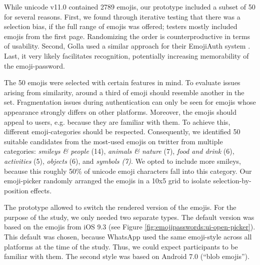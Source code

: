 While unicode v11.0 contained 2789 emojis, our prototype included a subset of 50 for several reasons. First, we found through iterative testing that there was a selection bias, if the full range of emojis was offered; testers mostly included emojis from the first page. Randomizing the order is counterproductive in terms of usability. Second, Golla \etal used a similar approach for their EmojiAuth system \cite{Golla2017EmojiAuth, Kraus2017Emoji}. Last, it very likely facilitates recognition, potentially increasing memorability of the emoji-password.

The 50 emojis were selected with certain features in mind. To evaluate issues arising from similarity, around a third of emoji should resemble another in the set. Fragmentation issues during authentication can only be seen for emojis whose appearance strongly differs on other platforms. Moreover, the emojis should appeal to users, e.g. because they are familiar with them. To achieve this, different emoji-categories should be respected. Consequently, we identified 50 suitable candidates from the most-used emojis on twitter from multiple categories: \textit{smileys \& people} (14), \textit{animals \& nature} (7), \textit{food and drink} (6), \textit{activities} (5), \textit{objects} (6), and \textit{symbols (7)}. We opted to include more smileys, because this roughly 50\% of unicode emoji characters fall into this category. Our emoji-picker randomly arranged the emojis in a 10x5 grid to isolate selection-by-position effects. 

The prototype allowed to switch the rendered version of the emojis. For the purpose of the study, we only needed two separate types. The default version was based on the emojis from iOS 9.3 (see Figure \ref{fig:emojipasswords:ui-open-picker}). This default was chosen, because WhatsApp used the same emoji-style across all platforms at the time of the study. Thus, we could expect participants to be familiar with them. The second style was based on Android 7.0 (``blob emojis''). 

